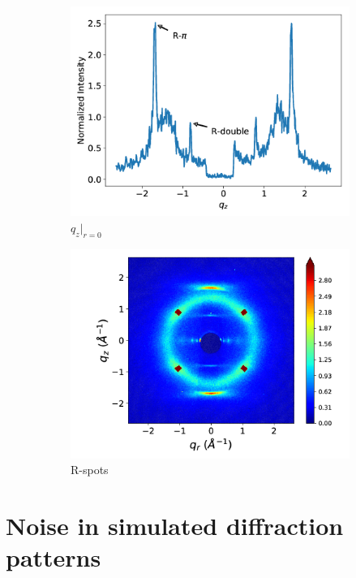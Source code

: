 \documentclass[journal=jpcbfk,manusciprt=article]{achemso}
\begin{document}
\begin{figure}[!htb]
\begin{subfigure}{0.45\linewidth}
  \includegraphics[width=\textwidth]{rpi_rdouble.png}
  \caption{$q_z|_{r=0}$}\label{fig:rpi_rdouble}
  \end{subfigure}
  \begin{subfigure}{0.45\linewidth}
  \centering
  \includegraphics[width=\textwidth]{rspots.png}
  \caption{R-spots}\label{fig:rspots}
  \end{subfigure}
  \caption{}\label{fig:xrd_intensities}
  \end{figure}
 
  \section{Noise in simulated diffraction patterns}\label{section:xrd_noise}
  
\end{document}
